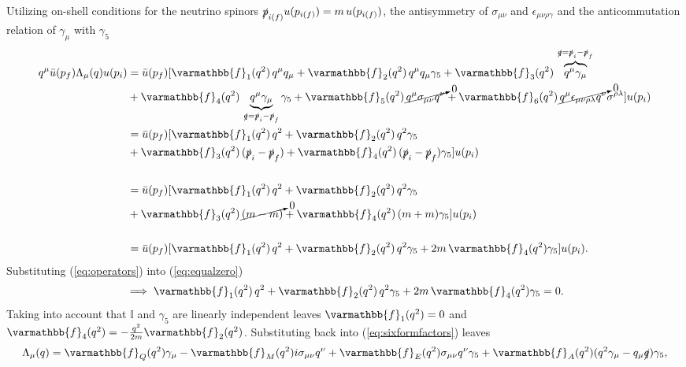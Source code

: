 Utilizing on-shell conditions for the neutrino spinors $\slashed{p}_{i(f)}u(p_{i(f)}) = m\,u(p_{i(f)})$, the antisymmetry of $\sigma_{\mu\nu}$ and $\epsilon_{\mu\nu\rho\gamma}$ and the anticommutation relation of $\gamma_\mu$ with $\gamma_5$
\vspace{-.25cm}
\begin{align} 
	\nonumber q^\mu \bar{u}(p_f) \Lambda_\mu (q) u(p_i)&= \bar{u}(p_f) [ \varmathbb{f}_1(q^2)\, q^\mu q_\mu
      + \varmathbb{f}_2(q^2)\,q^\mu q_\mu\gamma_5
      + \varmathbb{f}_3(q^2)\,\overbrace{q^\mu \gamma_\mu}^{\slashed{q} = \slashed{p}_i - \slashed{p}_f} \\ \nonumber
      &+ \varmathbb{f}_4(q^2)\,\underbrace{q^\mu \gamma_\mu}_{\slashed{q} = \slashed{p}_i - \slashed{p}_f} \gamma_5
      + \varmathbb{f}_5(q^2)\,\cancelto{0}{q^\mu\sigma_{\mu\nu}q^{\nu}}
      + \varmathbb{f}_6(q^2)\,\cancelto{0}{q^\mu\epsilon_{\mu\nu\rho\lambda}q^{\nu}}\sigma^{\rho\lambda}] u(p_i)
			\\\nonumber
			&=\bar{u}(p_f) [ \varmathbb{f}_1(q^2)\,q^2
      + \varmathbb{f}_2(q^2)\,q^2\gamma_5
      \\ \nonumber
      &+ \varmathbb{f}_3(q^2)\,(\slashed{p}_i - \slashed{p}_f)
			+ \varmathbb{f}_4(q^2)\,(\slashed{p}_i - \slashed{p}_f)\gamma_5] u(p_i)
			\\\nonumber
			\\\nonumber
			&=\bar{u}(p_f) [ \varmathbb{f}_1(q^2)\,q^2
      + \varmathbb{f}_2(q^2)\,q^2\gamma_5
      \\ \nonumber
      &+ \varmathbb{f}_3(q^2)\,\cancelto{0}{(m - m)}
			+ \varmathbb{f}_4(q^2)\,(m + m)\gamma_5] u(p_i)
			\\\nonumber
			\\\label{eq:operators}
			&=\bar{u}(p_f) [ \varmathbb{f}_1(q^2)\,q^2
							+ \varmathbb{f}_2(q^2)\,q^2\gamma_5
							+ 2m\,\varmathbb{f}_4(q^2)\gamma_5] u(p_i).
\end{align}
Substituting (\ref{eq:operators}) into (\ref{eq:equalzero})
\begin{equation}
	\implies  \varmathbb{f}_1(q^2)\,q^2 + \varmathbb{f}_2(q^2)\,q^2\gamma_5 + 2m\,\varmathbb{f}_4(q^2)\gamma_5 = 0.
\end{equation}
Taking into account that $\mathbb{I}$ and $\gamma_5$ are linearly independent leaves $\varmathbb{f}_1(q^2) = 0$ and $\varmathbb{f}_4(q^2) = -\frac{q^2}{2m} \varmathbb{f}_2(q^2)$. Substituting back into (\ref{eq:sixformfactors}) leaves
\begin{equation}\label{eq:EMformfactors}
	\Lambda_\mu(q) = \varmathbb{f}_Q(q^2)\gamma_\mu -\varmathbb{f}_{M}(q^2)i\sigma_{\mu\nu}q^\nu + \varmathbb{f}_E(q^2)\sigma_{\mu\nu}q^\nu\gamma_5 + \varmathbb{f}_A(q^2)(q^2\gamma_\mu-q_\mu\slashed{q})\gamma_5,
\end{equation}
